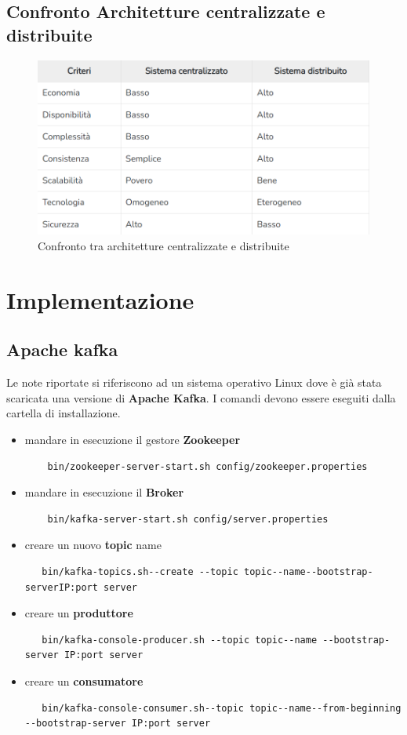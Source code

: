 \documentclass{article}
\begin{document}
\subsection{Confronto Architetture centralizzate e distribuite }
\begin{figure}[H]
    \centering
\includegraphics[scale=0.5]{images/central_vs_distribution.png}
    \caption{Confronto tra architetture centralizzate e distribuite}
    
\end{figure}
\section{Implementazione}
\subsection{Apache kafka}
Le note riportate si riferiscono ad un sistema operativo Linux dove è già stata scaricata una versione di \textbf{Apache Kafka}. I comandi devono essere eseguiti dalla cartella di installazione.
\begin{itemize}
    \item mandare in esecuzione il gestore \textbf{Zookeeper}
    \begin{lstlisting}
    bin/zookeeper-server-start.sh config/zookeeper.properties\end{lstlisting}
    \item mandare in esecuzione il \textbf{Broker}
    \begin{lstlisting}
    bin/kafka-server-start.sh config/server.properties\end{lstlisting}
    \item creare un nuovo \textbf{topic} name
   \noindent \begin{lstlisting}
   bin/kafka-topics.sh--create --topic topic--name--bootstrap-serverIP:port server \end{lstlisting}
   \item creare un \textbf{produttore} 
   \begin{lstlisting}
   bin/kafka-console-producer.sh --topic topic--name --bootstrap-server IP:port server \end{lstlisting}
   \item creare un \textbf{consumatore}
   \begin{lstlisting}
   bin/kafka-console-consumer.sh--topic topic--name--from-beginning --bootstrap-server IP:port server
   \end{lstlisting}

\end{itemize}
\end{document}
